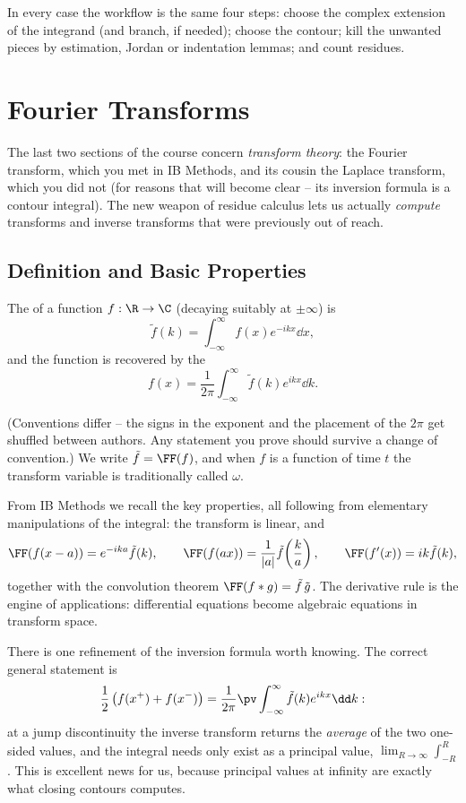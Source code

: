 In every case the workflow is the same four steps: choose the complex extension of the integrand (and branch, if needed); choose the contour; kill the unwanted pieces by estimation, Jordan or indentation lemmas; and count residues.

\section{Fourier Transforms}

The last two sections of the course concern \emph{transform theory}: the Fourier transform, which you met in IB Methods, and its cousin the Laplace transform, which you did not (for reasons that will become clear -- its inversion formula is a contour integral). The new weapon of residue calculus lets us actually \emph{compute} transforms and inverse transforms that were previously out of reach.

\subsection{Definition and Basic Properties}

\begin{definition}
	The  of a function $f : \R \to \C$ (decaying suitably at $\pm\infty$) is
	$$
	\tilde{f}(k) = \int_{-\infty}^\infty f(x) e^{-ikx} \dd x,
	$$
	and the function is recovered by the 
	$$
	f(x) = \frac{1}{2\pi} \int_{-\infty}^\infty \tilde{f}(k) e^{ikx} \dd k.
	$$
\end{definition}

(Conventions differ -- the signs in the exponent and the placement of the $2\pi$ get shuffled between authors. Any statement you prove should survive a change of convention.) We write $\tilde f = \FF(f)$, and when $f$ is a function of time $t$ the transform variable is traditionally called $\omega$.

From IB Methods we recall the key properties, all following from elementary manipulations of the integral: the transform is linear, and
$$
\FF(f(x - a)) = e^{-ika}\tilde f(k), \qquad
\FF(f(ax)) = \frac{1}{|a|} \tilde f\!\left(\frac ka\right), \qquad
\FF(f'(x)) = ik \tilde f(k),
$$
together with the convolution theorem $\FF(f * g) = \tilde f \, \tilde g$. The derivative rule is the engine of applications: differential equations become algebraic equations in transform space.

There is one refinement of the inversion formula worth knowing. The correct general statement is
$$
\frac{1}{2}\left(f(x^+) + f(x^-)\right) = \frac{1}{2\pi} \pv \int_{-\infty}^\infty \tilde f(k) e^{ikx} \dd k :
$$
at a jump discontinuity the inverse transform returns the \emph{average} of the two one-sided values, and the integral needs only exist as a principal value, $\lim_{R \to \infty} \int_{-R}^R$. This is excellent news for us, because principal values at infinity are exactly what closing contours computes.

